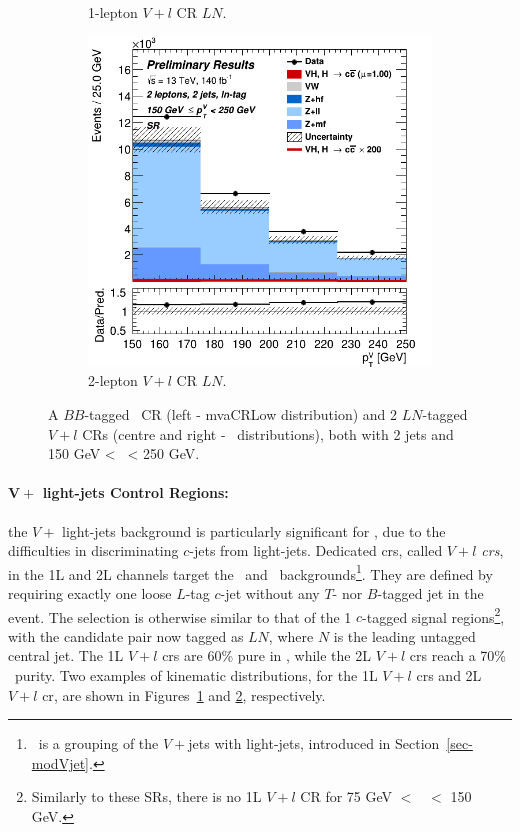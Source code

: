\begin{figure}[h!]
\begin{subfigure}[b]{0.32\textwidth}
      \caption{1-lepton $V+l$ CR $LN$.}
      \label{fig:plots_VHcc_ex_1L_CRvl}
  \end{subfigure}
  \begin{subfigure}[b]{0.32\textwidth}
    \centering
    \includegraphics[width=\textwidth]{Images/VH/Own_fit/prefit_VHcc/Region_distpTV_BMax250_BMin150_DSR_J2_TTypeln_T1_L2_Y6051_Prefit.png}
    \caption{2-lepton $V+l$ CR $LN$.}
    \label{fig:plots_VHcc_ex_2L_CRvl}
\end{subfigure}
  \caption{A $BB$-tagged \lowdr\ CR (left - mvaCRLow distribution) and 2 $LN$-tagged $V+l$ CRs (centre and right - \ptv\ distributions), both with 2 jets and 150 GeV < \ptv\ < 250 GeV.}
  \label{fig:plots_VH_ex_CRL_CRvl}
\end{figure} 

\paragraph{$\boldsymbol{V +}$ light-jets Control Regions:} the $V +$ light-jets background is particularly significant for \vhc, due to the difficulties in discriminating $c$-jets from light-jets. Dedicated \glspl{cr}, called \textit{$V+l$ \glspl{cr}}, in the 1L and 2L channels target the \wlf\ and \zlf\ backgrounds\footnote{\vlf\ is a grouping of the $V+$jets with light-jets, introduced in Section~\ref{sec-modVjet}.}. They are defined by requiring exactly one loose $L$-tag $c$-jet without any $T$- nor $B$-tagged jet in the event. The selection is otherwise similar to that of the 1 $c$-tagged signal regions\footnote{Similarly to these SRs, there is no 1L $V+l$ CR for 75 GeV $<$ \ptv\ $<$ 150 GeV.}, with the candidate pair now tagged as $LN$, where $N$ is the leading untagged central jet. The 1L $V+l$ \glspl{cr} are 60\% pure in \wlf, while the 2L $V+l$ \glspl{cr} reach a 70\% \zlf\ purity. Two examples of kinematic distributions, for the 1L $V+l$ \glspl{cr} and 2L $V+l$ \gls{cr}, are shown in Figures~\ref{fig:plots_VHcc_ex_1L_CRvl} and \ref{fig:plots_VHcc_ex_2L_CRvl}, respectively. 

